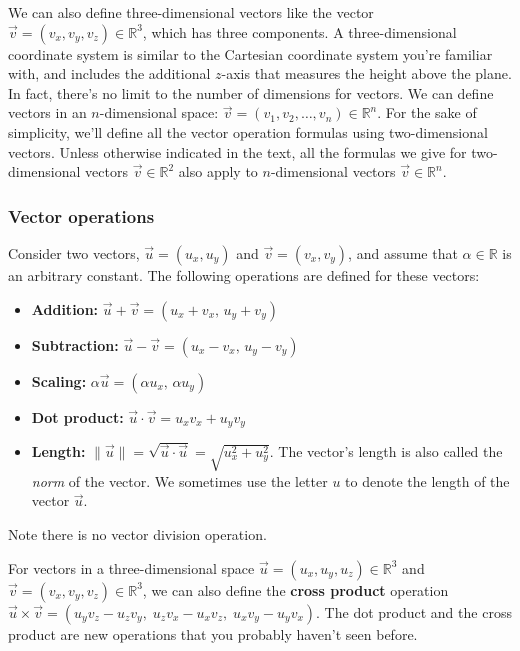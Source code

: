 		We can also define three-dimensional vectors like the vector $\vec{v} = (v_x, v_y, v_z) \in \mathbb{R}^3$,
		which has three components.
		A three-dimensional coordinate system is similar to the Cartesian coordinate system you're familiar with,
		and includes the additional $z$-axis that measures the height above the plane.
		In fact,
		there's no limit to the number of dimensions for vectors.
		We can define vectors in an $n$-dimensional space:								
		$\vec{v} = (v_1, v_2, \ldots, v_n) \in \mathbb{R}^n$.
		For the sake of simplicity,
		we'll define all the vector operation formulas using two-dimensional vectors.
		Unless otherwise indicated in the text,
		all the formulas we give for two-dimensional vectors $\vec{v} \in \mathbb{R}^2$
		also apply to $n$-dimensional vectors $\vec{v} \in \mathbb{R}^n$.


		\subsubsection{Vector operations}

			Consider two vectors,
			$\vec{u}=(u_x,u_y) $ and $\vec{v}=(v_x,v_y)$,
			and assume that $\alpha \in \mathbb{R}$ is an arbitrary constant. 
			The following operations are defined for these vectors:
			\begin{itemize}
				\item 	\textbf{Addition:}	$\vec{u} + \vec{v} = (u_x+v_x,\, u_y+v_y)$
				\item 	\textbf{Subtraction:}	$\vec{u} - \vec{v} = (u_x-v_x,\, u_y-v_y)$
				\item 	\textbf{Scaling:}		$\alpha \vec{u} = (\alpha u_x,\, \alpha u_y)$
				\item 	\textbf{Dot product:}	$\vec{u} \cdot \vec{v}  = u_xv_x+u_yv_y$								
				\item 	\textbf{Length:}		$\|\vec{u}\| = \sqrt{\vec{u}\cdot\vec{u}} = \sqrt{u_x^2+u_y^2}$.
						The vector's length is also called the \emph{norm} of the vector.
						We sometimes use the letter $u$ to denote the length of the vector $\vec{u}$.
			\end{itemize}

			\noindent
			Note there is no vector division operation.

			For vectors in a three-dimensional space $\vec{u}=(u_x,u_y,u_z) \in \mathbb{R}^3$
			and $\vec{v}=(v_x,v_y,v_z) \in \mathbb{R}^3$,
			we can also define the \textbf{cross product} operation												
			$\vec{u} \times \vec{v} = (u_yv_z-u_zv_y,\; u_zv_x-u_xv_z,\; u_xv_y-u_yv_x)$.
			The dot product and the cross product are new operations that you probably haven't seen before.


